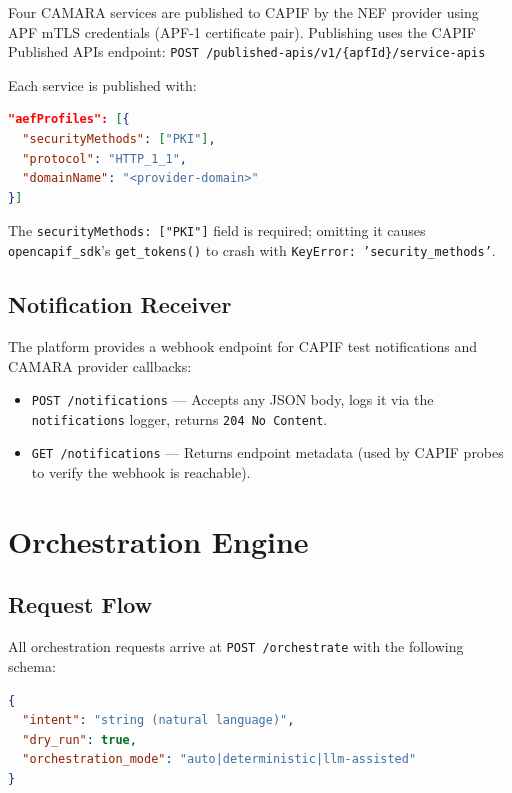 \documentclass[conference]{IEEEtran}
\begin{document}
Four CAMARA services are published to CAPIF by the NEF provider using APF
mTLS credentials (APF-1 certificate pair). Publishing uses the CAPIF
Published APIs endpoint:
\texttt{POST /published-apis/v1/\{apfId\}/service-apis}

Each service is published with:
\begin{lstlisting}[language=json]
"aefProfiles": [{
  "securityMethods": ["PKI"],
  "protocol": "HTTP_1_1",
  "domainName": "<provider-domain>"
}]
\end{lstlisting}

The \texttt{securityMethods: ["PKI"]} field is required; omitting it causes
\texttt{opencapif\_sdk}'s \texttt{get\_tokens()} to crash with
\texttt{KeyError: 'security\_methods'}.

\subsection{Notification Receiver}

The platform provides a webhook endpoint for CAPIF test notifications and
CAMARA provider callbacks:

\begin{itemize}[leftmargin=1.2em]
  \item \texttt{POST /notifications} — Accepts any JSON body, logs it via the
        \texttt{notifications} logger, returns \texttt{204 No Content}.
  \item \texttt{GET /notifications} — Returns endpoint metadata (used by
        CAPIF probes to verify the webhook is reachable).
\end{itemize}

\section{Orchestration Engine}
\label{sec:orchestration}

\subsection{Request Flow}

All orchestration requests arrive at \texttt{POST /orchestrate} with the
following schema:

\begin{lstlisting}[language=json]
{
  "intent": "string (natural language)",
  "dry_run": true,
  "orchestration_mode": "auto|deterministic|llm-assisted"
}
\end{lstlisting}
\end{document}
